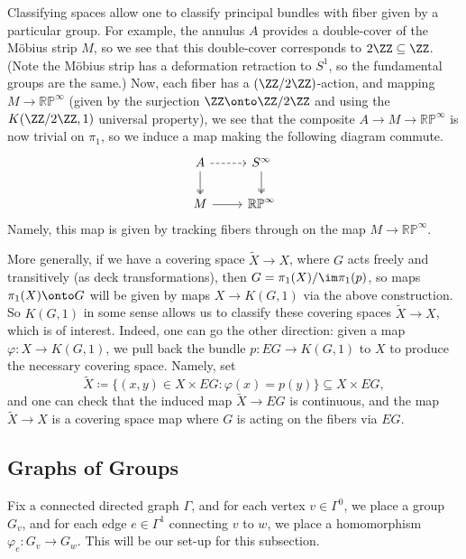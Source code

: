 \documentclass[../notes.tex]{subfiles}
\begin{document}
Classifying spaces allow one to classify principal bundles with fiber given by a particular group. For example, the annulus $A$ provides a double-cover of the M\"obius strip $M$, so we see that this double-cover corresponds to $2\ZZ\subseteq\ZZ$. (Note the M\"obius strip has a deformation retraction to $S^1$, so the fundamental groups are the same.) Now, each fiber has a $(\ZZ/2\ZZ)$-action, and mapping $M\to\mathbb{RP}^\infty$ (given by the surjection $\ZZ\onto\ZZ/2\ZZ$ and using the $K(\ZZ/2\ZZ,1)$ universal property), we see that the composite $A\to M\to\mathbb{RP}^\infty$ is now trivial on $\pi_1$, so we induce a map making the following diagram commute.
\[\begin{tikzcd}
	A & {S^\infty} \\
	M & {\mathbb{RP}^\infty}
	\arrow[two heads, from=1-1, to=2-1]
	\arrow[from=2-1, to=2-2]
	\arrow[two heads, from=1-2, to=2-2]
	\arrow[dashed, from=1-1, to=1-2]
\end{tikzcd}\]
Namely, this map is given by tracking fibers through on the map $M\to\mathbb{RP}^\infty$.

More generally, if we have a covering space $\widetilde X\to X$, where $G$ acts freely and transitively (as deck transformations), then $G=\pi_1(X)/\im\pi_1(p)$, so maps $\pi_1(X)\onto G$ will be given by maps $X\to K(G,1)$ via the above construction. So $K(G,1)$ in some sense allows us to classify these covering spaces $\widetilde X\to X$, which is of interest. Indeed, one can go the other direction: given a map $\varphi\colon X\to K(G,1)$, we pull back the bundle $p\colon EG\to K(G,1)$ to $X$ to produce the necessary covering space. Namely, set
\[\widetilde X\coloneqq\{(x,y)\in X\times EG:\varphi(x)=p(y)\}\subseteq X\times EG,\]
and one can check that the induced map $\widetilde X\to EG$ is continuous, and the map $\widetilde X\to X$ is a covering space map where $G$ is acting on the fibers via $EG$.

\subsection{Graphs of Groups}
Fix a connected directed graph $\Gamma$, and for each vertex $v\in\Gamma^0$, we place a group $G_v$, and for each edge $e\in\Gamma^1$ connecting $v$ to $w$, we place a homomorphism $\varphi_e\colon G_v\to G_w$. This will be our set-up for this subsection.
\end{document}
